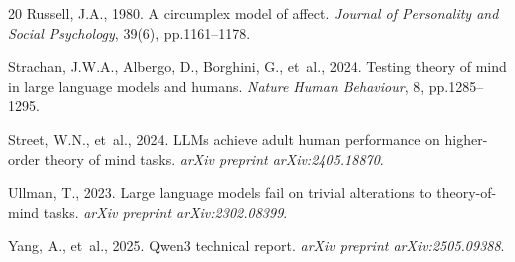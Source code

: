 \documentclass[11pt,a4paper]{article}
\begin{document}
\begin{thebibliography}{20}
Russell, J.A., 1980. A circumplex model of affect. \textit{Journal of Personality and Social Psychology}, 39(6), pp.1161--1178.

Strachan, J.W.A., Albergo, D., Borghini, G., et~al., 2024. Testing theory of mind in large language models and humans. \textit{Nature Human Behaviour}, 8, pp.1285--1295.

Street, W.N., et~al., 2024. LLMs achieve adult human performance on higher-order theory of mind tasks. \textit{arXiv preprint arXiv:2405.18870}.

Ullman, T., 2023. Large language models fail on trivial alterations to theory-of-mind tasks. \textit{arXiv preprint arXiv:2302.08399}.

Yang, A., et~al., 2025. Qwen3 technical report. \textit{arXiv preprint arXiv:2505.09388}.

\end{thebibliography}
\end{document}
